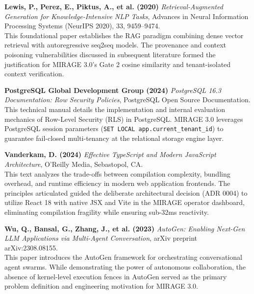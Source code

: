 \documentclass[12pt,a4paper]{report}
\numberwithin{equation}{section}
\begin{document}
\begin{enumerate}[label={[\arabic*]}, leftmargin=2.5em]
    \item \textbf{Lewis, P., Perez, E., Piktus, A., et al. (2020)} \textit{Retrieval-Augmented Generation for Knowledge-Intensive NLP Tasks}, Advances in Neural Information Processing Systems (NeurIPS 2020), 33, 9459--9474.\\
    This foundational paper establishes the RAG paradigm combining dense vector retrieval with autoregressive seq2seq models. The provenance and context poisoning vulnerabilities discussed in subsequent literature formed the justification for MIRAGE 3.0's Gate 2 cosine similarity and tenant-isolated context verification.

    \item \textbf{PostgreSQL Global Development Group (2024)} \textit{PostgreSQL 16.3 Documentation: Row Security Policies}, PostgreSQL Open Source Documentation.\\
    This technical manual details the implementation and internal evaluation mechanics of Row-Level Security (RLS) in PostgreSQL. MIRAGE 3.0 leverages PostgreSQL session parameters (\texttt{SET LOCAL app.current\_tenant\_id}) to guarantee fail-closed multi-tenancy at the relational storage engine layer.

    \item \textbf{Vanderkam, D. (2024)} \textit{Effective TypeScript and Modern JavaScript Architecture}, O'Reilly Media, Sebastopol, CA.\\
    This text analyzes the trade-offs between compilation complexity, bundling overhead, and runtime efficiency in modern web application frontends. The principles articulated guided the deliberate architectural decision (ADR 0004) to utilize React 18 with native JSX and Vite in the MIRAGE operator dashboard, eliminating compilation fragility while ensuring sub-32ms reactivity.

    \item \textbf{Wu, Q., Bansal, G., Zhang, J., et al. (2023)} \textit{AutoGen: Enabling Next-Gen LLM Applications via Multi-Agent Conversation}, arXiv preprint arXiv:2308.08155.\\
    This paper introduces the AutoGen framework for orchestrating conversational agent swarms. While demonstrating the power of autonomous collaboration, the absence of kernel-level execution fences in AutoGen served as the primary problem definition and engineering motivation for MIRAGE 3.0.
\end{enumerate}
\end{document}
